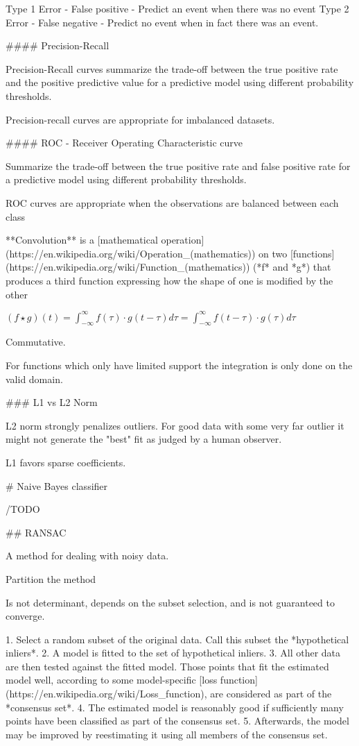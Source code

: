 Type 1 Error - False positive - Predict an event when there was no event
Type 2 Error - False negative - Predict no event when in fact there was an event.

#### Precision-Recall

Precision-Recall curves summarize the trade-off between the true positive rate and the positive predictive value for a predictive model using different probability thresholds.

Precision-recall curves are appropriate for imbalanced datasets.

#### ROC -  Receiver Operating Characteristic curve

Summarize the trade-off between the true positive rate and false positive rate for a predictive model using different probability thresholds.

ROC curves are appropriate when the observations are balanced between each class

**Convolution** is a [mathematical operation](https://en.wikipedia.org/wiki/Operation_(mathematics)) on two [functions](https://en.wikipedia.org/wiki/Function_(mathematics)) (*f* and *g*) that produces a third function expressing how the shape of one is modified by the other

$(f\star g)(t) = \int_{-\infty}^{\infty} f(\tau)\cdot g(t-\tau)d\tau = \int_{-\infty}^{\infty} f(t-\tau)\cdot g(\tau)d\tau $

Commutative. 

For functions which only have limited support the integration is only done on the valid domain.

### L1 vs L2 Norm

L2 norm strongly penalizes outliers. For good data with some very far outlier it might not generate the "best" fit as judged by a human observer.

L1 favors sparse coefficients.

# Naive Bayes classifier

/TODO

## RANSAC

A method for dealing with noisy data. 

Partition the method 

Is not determinant, depends on the subset selection, and is not guaranteed to converge.

1. Select a random subset of the original data. Call this subset the *hypothetical inliers*.
2. A model is fitted to the set of hypothetical inliers.
3. All other data are then tested against the fitted model. Those points that fit the estimated model well, according to some model-specific [loss function](https://en.wikipedia.org/wiki/Loss_function), are considered as part of the *consensus set*.
4. The estimated model is reasonably good if sufficiently many points have been classified as part of the consensus set.
5. Afterwards, the model may be improved by reestimating it using all members of the consensus set.

